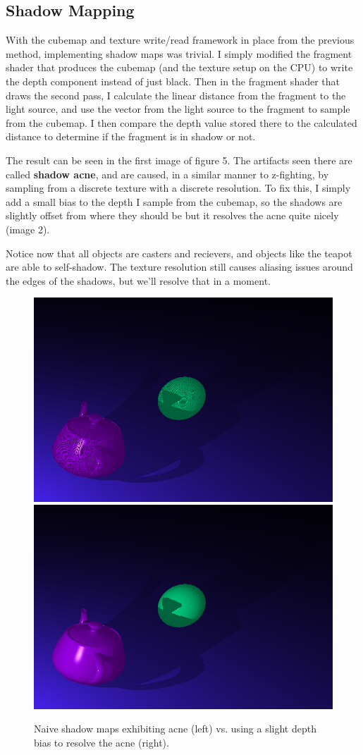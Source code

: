 \documentclass[acmsmall, screen, authorversion, nonacm]{acmart}
\begin{document}
\subsection{Shadow Mapping}

With the cubemap and texture write/read framework in place from the previous method, implementing shadow maps was trivial. I simply modified the fragment shader that produces the cubemap (and the texture setup on the CPU) to write the depth component instead of just black. Then in the fragment shader that draws the second pass, I calculate the linear distance\cite{de2015learn} from the fragment to the light source, and use the vector from the light source to the fragment to sample from the cubemap. I then compare the depth value stored there to the calculated distance to determine if the fragment is in shadow or not.

The result can be seen in the first image of figure 5. The artifacts seen there are called \textbf{shadow acne}, and are caused, in a similar manner to z-fighting, by sampling from a discrete texture with a discrete resolution. To fix this, I simply add a small bias to the depth I sample from the cubemap, so the shadows are slightly offset from where they should be but it resolves the acne quite nicely (image 2).

Notice now that all objects are casters and recievers, and objects like the teapot are able to self-shadow. The texture resolution still causes aliasing issues around the edges of the shadows, but we'll resolve that in a moment.

\begin{figure}
	\includegraphics[width=.49\linewidth]{images/maps_1}\hfill
	\includegraphics[width=.49\linewidth]{images/maps_2}
	\caption{Naive shadow maps exhibiting acne (left) vs. using a slight depth bias to resolve the acne (right).}
\end{figure}
\end{document}
